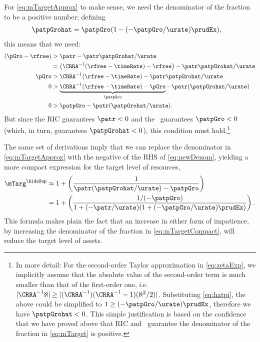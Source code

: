 \documentclass{\handout}
\begin{document}
For \eqref{eq:mTargetApprox} to make sense, we need
the denominator of the fraction to be a positive number;
defining
\begin{equation}\begin{gathered}\begin{aligned}
  \patpGrohat & =  \patpGro(1-(-\patpGro/\urate)\prudEx),
\end{aligned}\end{gathered}\end{equation}
this means that we need:
\begin{equation}\begin{gathered}\begin{aligned}
    (\pGro - \rfree) & >  \patr - \patr\patpGrohat/\urate
\\   & =  \left(\CRRA^{-1}(\rfree-\timeRate)-\rfree\right)-  \patr\patpGrohat/\urate
\\ \pGro & >  \CRRA^{-1}(\rfree-\timeRate)-  \patr\patpGrohat/\urate
\\ 0 & >  \underbrace{\CRRA^{-1}(\rfree-\timeRate) - \pGro}_{\patpGro} -  \patr(\patpGrohat/\urate)
\\ 0 & >  \patpGro -  \patr(\patpGrohat/\urate) \label{eq:newDenom}
.
\end{aligned}\end{gathered}\end{equation}
But since the RIC guarantees $\patr<0$ and the \GICPGro~guarantees $\patpGro<0$ (which, in turn, guarantees $\patpGrohat < 0$), this condition must hold.\footnote{In more detail: For the second-order Taylor approximation in \eqref{eq:zetaExp}, we implicitly assume that the absolute value of the second-order term is much smaller than that of the first-order one, i.e. $|\CRRA^{-1} \aleph | \geq |(\CRRA^{-1})(\CRRA^{-1}-1)(\aleph^{2}/2)|$. Substituting \eqref{eq:hatpi}, the above could be simplified to $1 \geq (-\patpGro/\urate)\prudEx$, therefore we have $\patpGrohat < 0$. This simple justification is based on the confidence that we have proved above that RIC and \GICPGro~guarantee the denominator of the fraction in \eqref{eq:mTarget} is positive.}

The same set of derivations imply that we can
replace the denominator in \eqref{eq:mTargetApprox} with the negative
of the RHS of \eqref{eq:newDenom}, yielding a more compact expression
for the target level of resources,
\begin{equation}\begin{gathered}\begin{aligned}
 \mTarg^{\hideSup} & \approx  1 + \left(\frac{1}{\patr(\patpGrohat/\urate) - \patpGro }\right)
\\ & =  1 + \left(\frac{1/(-\patpGro)}{1+(-\patr/\urate)(1+(-\patpGro/\urate)\prudEx)  }\right) \label{eq:mTargetCompact}
.
\end{aligned}\end{gathered}\end{equation}
This formula makes plain the fact that an
increase in either form of impatience, by increasing the denominator of the 
fraction in 
\eqref{eq:mTargetCompact}, will reduce the target level of assets.
\end{document}
